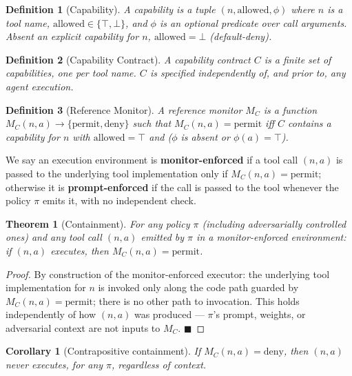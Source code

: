 \documentclass[11pt]{article}
\newtheorem{definition}{Definition}
\newtheorem{theorem}{Theorem}
\newtheorem{corollary}{Corollary}
\begin{document}
\begin{definition}[Capability]
A capability is a tuple $(n, \text{allowed}, \phi)$ where $n$ is a tool name,
$\text{allowed} \in \{\top, \bot\}$, and $\phi$ is an optional predicate over call
arguments. Absent an explicit capability for $n$, $\text{allowed} = \bot$
(\emph{default-deny}).
\end{definition}

\begin{definition}[Capability Contract]
A capability contract $C$ is a finite set of capabilities, one per tool name. $C$ is
specified independently of, and prior to, any agent execution.
\end{definition}

\begin{definition}[Reference Monitor]
A reference monitor $M_C$ is a function $M_C(n, a) \to \{\text{permit}, \text{deny}\}$ such
that $M_C(n, a) = \text{permit}$ iff $C$ contains a capability for $n$ with
$\text{allowed} = \top$ and ($\phi$ is absent or $\phi(a) = \top$).
\end{definition}

We say an execution environment is \textbf{monitor-enforced} if a tool call $(n, a)$ is
passed to the underlying tool implementation only if $M_C(n, a) = \text{permit}$;
otherwise it is \textbf{prompt-enforced} if the call is passed to the tool whenever the
policy $\pi$ emits it, with no independent check.

\begin{theorem}[Containment]
\label{thm:containment}
For any policy $\pi$ (including adversarially controlled ones) and any tool call
$(n, a)$ emitted by $\pi$ in a monitor-enforced environment: if $(n, a)$ executes, then
$M_C(n, a) = \text{permit}$.
\end{theorem}

\begin{proof}
By construction of the monitor-enforced executor: the underlying tool implementation for
$n$ is invoked only along the code path guarded by $M_C(n, a) = \text{permit}$; there is no
other path to invocation. This holds independently of how $(n, a)$ was produced — $\pi$'s
prompt, weights, or adversarial context are not inputs to $M_C$. $\blacksquare$
\end{proof}

\begin{corollary}[Contrapositive containment]
If $M_C(n, a) = \text{deny}$, then $(n, a)$ never executes, for any $\pi$, regardless of
context.
\end{corollary}
\end{document}
